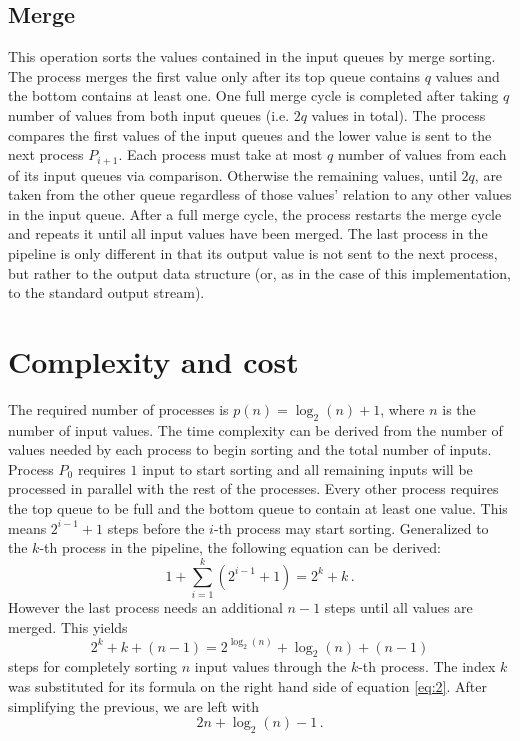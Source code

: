 \documentclass[pdftex, 11pt, a4paper, titlepage]{article}
\begin{document}
        \subsection*{Merge}
        This operation sorts the values contained in the input queues by merge sorting. The process merges the first value
        only after its top queue contains $q$ values and the bottom contains at least one. One full merge cycle is completed
        after taking $q$ number of values from both input queues (i.e. $2q$ values in total). The process compares the first
        values of the input queues and the lower value is sent to the next process $P_{i+1}$. Each process must take
        at most $q$ number of values from each of its input queues via comparison. Otherwise the remaining values, until $2q$,
        are taken from the other queue regardless of those values' relation to any other values in the input queue.
        After a full merge cycle, the process restarts the merge cycle and repeats it until all input values have been merged.
        The last process in the pipeline is only different in that its output value is not sent to the next process, but rather
        to the output data structure (or, as in the case of this implementation, to the standard output stream).

        \section{Complexity and cost}
        The required number of processes is $p(n) = \log_{2}(n)+1$, where $n$ is the number of input values. The time complexity
        can be derived from the number of values needed by each process to begin sorting and the total number of inputs.
        Process $P_0$ requires $1$ input to start sorting and all remaining inputs will be processed in parallel with the rest
        of the processes. Every other process requires the top queue to be full and the bottom queue to contain at least one value.
        This means $2^{i-1} + 1$ steps before the $i$-th process may start sorting. Generalized to the $k$-th process in the pipeline,
        the following equation can be derived:
        \begin{equation}\label{eq:1}
            1 + \sum_{i=1}^{k}(2^{i-1}+1) = 2^{k} + k\,.
        \end{equation}
        However the last process needs an additional $n-1$ steps until all values are merged. This yields
        \begin{equation}\label{eq:2}
            2^{k} + k + (n-1) = 2^{\log_{2}(n)} + \log_{2}(n) + (n-1)
        \end{equation}
        steps for completely sorting $n$ input values through the $k$-th process. The index $k$ was substituted for its formula
        on the right hand side of equation \ref{eq:2}. After simplifying the previous, we are left with
        \begin{equation}\label{eq:3}
            2n + \log_{2}(n) - 1\,.
        \end{equation}
\end{document}
